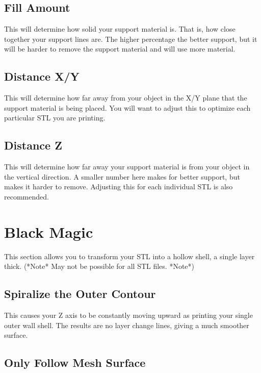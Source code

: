 \subsection{Fill Amount}

This will determine how solid your support material is. That is, how close together your support lines are. The higher percentage the better support, but it will be harder to remove the support material and will use more material.

\subsection{Distance X/Y}

This will determine how far away from your object in the X/Y plane that the support material is being placed. You will want to adjust this to optimize each particular STL you are printing.

\subsection{Distance Z}

This will determine how far away your support material is from your object in the vertical direction. A smaller number here makes for better support, but makes it harder to remove. Adjusting this for each individual STL is also recommended.

\section{Black Magic}

This section allows you to transform your STL into a hollow shell, a single layer thick. (*Note* May not be possible for all STL files. *Note*)

\subsection{Spiralize the Outer Contour}

This causes your Z axis to be constantly moving upward as printing your single outer wall shell. The results are no layer change lines, giving a much smoother surface.

\subsection{Only Follow Mesh Surface}

